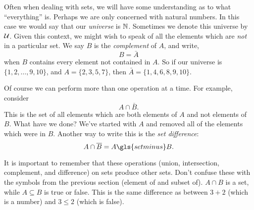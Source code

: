 \documentclass[12pt]{article}
\begin{document}
Often when dealing with sets, we will have some understanding as to what ``everything'' is.  Perhaps we are only concerned with natural numbers.  In this case we would say that our \emph{universe} is $\mathbb N$.  Sometimes we denote this universe by $\mathcal U$.  Given this context, we might wish to speak of all the elements which are \emph{not} in a particular set.  We say $B$ is the \emph{complement} of $A$, and write,
\[ B = \bar A\]
when $B$ contains every element not contained in $A$.  So if our universe is $\{1, 2,\ldots, 9, 10\}$, and $A = \{2, 3, 5, 7\}$, then $\bar A = \{1, 4, 6, 8, 9,10\}$.

Of course we can perform more than one operation at a time.  For example, consider
\[A \cap \bar B.\]
This is the set of all elements which are both elements of $A$ and not elements of $B$.  What have we done?  We've started with $A$ and removed all of the elements which were in $B$.  Another way to write this is the \emph{set difference}:
\[A \cap \bar B = A \gls{setminus} B.\]

It is important to remember that these operations (union, intersection, complement, and difference) on sets produce other sets.  Don't confuse these with the symbols from the previous section (element of and subset of).  $A \cap B$ is a set, while $A \subseteq B$ is true or false.  This is the same difference as between $3 + 2$ (which is a number) and $3 \le 2$ (which is false).
\end{document}
